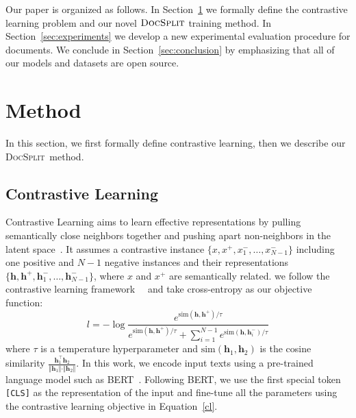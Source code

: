 \documentclass[11pt]{article}
\newcommand{\our}{\mbox{\textsc{DocSplit}}}
\begin{document}

Our paper is organized as follows.
In Section~\ref{sec:method} we formally define the contrastive learning problem and our novel $\our$ training method.
In Section~\ref{sec:experiments} we develop a new experimental evaluation procedure for documents.
We conclude in Section~\ref{sec:conclusion} by emphasizing that all of our models and datasets are open source.

\section{Method}

\label{sec:method}
In this section, we first formally define contrastive learning, then we describe our \our~method.
\subsection{Contrastive Learning}
Contrastive Learning aims to learn effective representations by pulling semantically close neighbors together and pushing apart non-neighbors in the latent space~\cite{Hadsell2006DimensionalityRB}.
It assumes a contrastive instance $\{x, x^{+}, x_1^{-},\dots,x_{N-1}^{-}\}$ including one positive and $N-1$ negative instances and their representations $\{\mathbf{h}, \mathbf{h}^{+}, \mathbf{h}_1^{-}, \dots,
\mathbf{h}_{N-1}^{-}\}$, where $x$ and $x^{+}$ are semantically related.
we follow the contrastive learning framework~~\cite{Chen2020ASF, Li2022UCTopicUC} and take cross-entropy as our objective function:
\begin{equation}
\label{cl}
    l = -\log \frac{e^{\mathrm{sim}(\mathbf{h}, \mathbf{h}^{+})/\tau}}{e^{\mathrm{sim}(\mathbf{h}, \mathbf{h}^{+})/\tau}+ \sum_{i=1}^{N-1}e^{\mathrm{sim}(\mathbf{h}, \mathbf{h}_i^{-})/\tau}}
\end{equation}
where $\tau$ is a temperature hyperparameter and $\mathrm{sim}(\mathbf{h}_1, \mathbf{h}_2)$ is the cosine similarity $\frac{\mathbf{h}_1^{\top}\mathbf{h}_2}{\Vert \mathbf{h}_1 \Vert \cdot \Vert \mathbf{h}_2 \Vert}$.
In this work, we encode input texts using a pre-trained language model such as BERT~\cite{Devlin2019BERTPO}. Following BERT, we use the first special token \texttt{[CLS]} as the representation of the input and fine-tune all the parameters using the contrastive learning objective in Equation~\ref{cl}.
\end{document}
